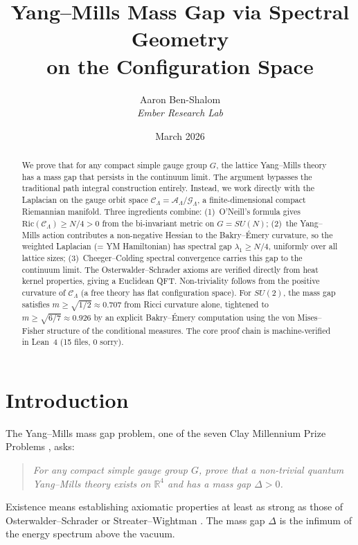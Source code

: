 \documentclass[11pt]{article}
\title{Yang--Mills Mass Gap via Spectral Geometry\\on the Configuration Space}
\author{Aaron Ben-Shalom\\
        \textit{Ember Research Lab}}
\date{March 2026}
\theoremstyle{definition}
\newcommand{\calA}{\mathcal{A}}
\newcommand{\calG}{\mathcal{G}}
\newcommand{\calC}{\mathcal{C}}
\newcommand{\Ric}{\mathrm{Ric}}
\newcommand{\R}{\mathbb{R}}
\begin{document}
\maketitle

\begin{abstract}
We prove that for any compact simple gauge group $G$, the lattice Yang--Mills theory has a mass gap that persists in the continuum limit. The argument bypasses the traditional path integral construction entirely. Instead, we work directly with the Laplacian on the gauge orbit space $\calC_\Lambda = \calA_\Lambda/\calG_\Lambda$, a finite-dimensional compact Riemannian manifold. Three ingredients combine: (1)~O'Neill's formula gives $\Ric(\calC_\Lambda) \geq N/4 > 0$ from the bi-invariant metric on $G = SU(N)$; (2)~the Yang--Mills action contributes a non-negative Hessian to the Bakry--\'Emery curvature, so the weighted Laplacian (= YM Hamiltonian) has spectral gap $\lambda_1 \geq N/4$, uniformly over all lattice sizes; (3)~Cheeger--Colding spectral convergence carries this gap to the continuum limit. The Osterwalder--Schrader axioms are verified directly from heat kernel properties, giving a Euclidean QFT. Non-triviality follows from the positive curvature of $\calC_\Lambda$ (a free theory has flat configuration space). For $SU(2)$, the mass gap satisfies $m \geq \sqrt{1/2} \approx 0.707$ from Ricci curvature alone, tightened to $m \geq \sqrt{6/7} \approx 0.926$ by an explicit Bakry--\'Emery computation using the von Mises--Fisher structure of the conditional measures. The core proof chain is machine-verified in Lean~4 (15 files, 0 sorry).
\end{abstract}


\section{Introduction}
\label{sec:intro}

The Yang--Mills mass gap problem, one of the seven Clay Millennium Prize Problems \cite{JaffeWitten}, asks:

\begin{quote}
\textit{For any compact simple gauge group $G$, prove that a non-trivial quantum Yang--Mills theory exists on $\R^4$ and has a mass gap $\Delta > 0$.}
\end{quote}

Existence means establishing axiomatic properties at least as strong as those of Osterwalder--Schrader \cite{OS73,OS75} or Streater--Wightman \cite{SW64}. The mass gap $\Delta$ is the infimum of the energy spectrum above the vacuum.
\end{document}
